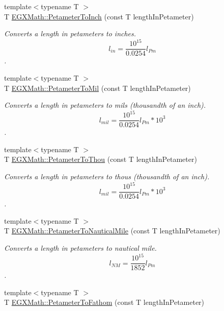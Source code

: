 \begin{DoxyCompactItemize}
{\footnotesize template$<$typename T $>$ }\\T \mbox{\hyperlink{group___e_g_x_math-_conversions-_length_conversions-_s_i-_petameter-_imperial_ga8e0128613c738b54c64e5bdd37f41b5b}{E\+G\+X\+Math\+::\+Petameter\+To\+Inch}} (const T length\+In\+Petameter)
\begin{DoxyCompactList}\small\item\em Converts a length in petameters to inches. \[ l_{in}= \frac{10^{15}}{0.0254} l_{Pm} \]. \end{DoxyCompactList}\item 
{\footnotesize template$<$typename T $>$ }\\T \mbox{\hyperlink{group___e_g_x_math-_conversions-_length_conversions-_s_i-_petameter-_imperial_ga044a0e99c9e8335dc196daf1efb9c90f}{E\+G\+X\+Math\+::\+Petameter\+To\+Mil}} (const T length\+In\+Petameter)
\begin{DoxyCompactList}\small\item\em Converts a length in petameters to mils (thousandth of an inch). \[ l_{mil}= \frac{10^{15}}{0.0254} l_{Pm} * 10^{3} \]. \end{DoxyCompactList}\item 
{\footnotesize template$<$typename T $>$ }\\T \mbox{\hyperlink{group___e_g_x_math-_conversions-_length_conversions-_s_i-_petameter-_imperial_gadcb69779fdf2696d6b9e13e2b23e6216}{E\+G\+X\+Math\+::\+Petameter\+To\+Thou}} (const T length\+In\+Petameter)
\begin{DoxyCompactList}\small\item\em Converts a length in petameters to thous (thousandth of an inch). \[ l_{mil}= \frac{10^{15}}{0.0254} l_{Pm} * 10^{3} \]. \end{DoxyCompactList}\item 
{\footnotesize template$<$typename T $>$ }\\T \mbox{\hyperlink{group___e_g_x_math-_conversions-_length_conversions-_s_i-_petameter-_nautical_gad71d96fd4a94e830ae0e768a41d993af}{E\+G\+X\+Math\+::\+Petameter\+To\+Nautical\+Mile}} (const T length\+In\+Petameter)
\begin{DoxyCompactList}\small\item\em Converts a length in petameters to nautical mile. \[ l_{NM}= \frac{10^{15}}{1852} l_{Pm} \]. \end{DoxyCompactList}\item 
{\footnotesize template$<$typename T $>$ }\\T \mbox{\hyperlink{group___e_g_x_math-_conversions-_length_conversions-_s_i-_petameter-_nautical_ga889ce7d71b84adea6f568fed8857fbab}{E\+G\+X\+Math\+::\+Petameter\+To\+Fathom}} (const T length\+In\+Petameter)

\end{DoxyCompactItemize}
